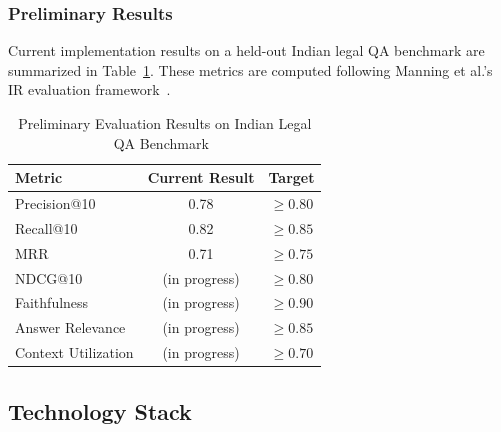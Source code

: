 \documentclass[12pt,a4paper]{article}
\begin{document}
\subsubsection{Preliminary Results}

Current implementation results on a held-out Indian legal QA benchmark are summarized
in Table~\ref{tab:results}. These metrics are computed following Manning et al.'s IR
evaluation framework~\cite{manning2008ir}.

\begin{table}[H]
\centering
\caption{Preliminary Evaluation Results on Indian Legal QA Benchmark~\cite{manning2008ir}}
\label{tab:results}
\begin{tabular}{lcc}
\toprule
\textbf{Metric}          & \textbf{Current Result} & \textbf{Target} \\
\midrule
Precision@10             & 0.78                    & $\geq 0.80$     \\
Recall@10                & 0.82                    & $\geq 0.85$     \\
MRR                      & 0.71                    & $\geq 0.75$     \\
NDCG@10                  & (in progress)           & $\geq 0.80$     \\
Faithfulness             & (in progress)           & $\geq 0.90$     \\
Answer Relevance         & (in progress)           & $\geq 0.85$     \\
Context Utilization      & (in progress)           & $\geq 0.70$     \\
\bottomrule
\end{tabular}
\end{table}

\subsection{Technology Stack}
\end{document}
